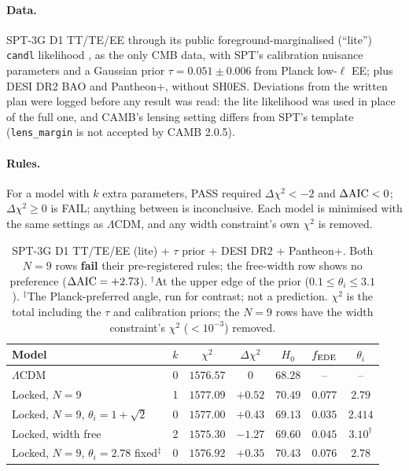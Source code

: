 \documentclass[11pt]{article}
\newcommand{\SPTfreeDchi}{\ensuremath{-1.27}}   %
\newcommand{\SPTfreeHz}{\ensuremath{69.60}}     %
\newcommand{\SPTfreeF}{\ensuremath{0.045}}      %
\newcommand{\SPTfreeVerdict}{no preference ($\Delta{\rm AIC}=+2.73$)}
\begin{document}
\paragraph{Data.} SPT-3G D1 TT/TE/EE \cite{camphuis2025} through its public foreground-marginalised
(``lite'') \texttt{candl} likelihood \cite{balkenhol2024}, as the only CMB data, with SPT's calibration
nuisance parameters and a Gaussian prior $\tau=0.051\pm0.006$ from Planck low-$\ell$ EE; plus DESI DR2
BAO and Pantheon+, without SH0ES. Deviations from the written plan were logged before any result was
read: the lite likelihood was used in place of the full one, and CAMB's lensing setting differs from
SPT's template (\texttt{lens\_margin} is not accepted by CAMB 2.0.5).

\paragraph{Rules.} For a model with $k$ extra parameters, PASS required $\Delta\chi^2<-2$ and
$\Delta{\rm AIC}<0$; $\Delta\chi^2\ge0$ is FAIL; anything between is inconclusive. Each model is
minimised with the same settings as $\Lambda$CDM, and any width constraint's own $\chi^2$ is removed.

\begin{table}[h]
\centering
\small
\begin{tabular}{lcccccc}
\toprule
Model & $k$ & $\chi^2$ & $\Delta\chi^2$ & $H_0$ & $f_{\rm EDE}$ & $\theta_i$\\
\midrule
$\Lambda$CDM & 0 & $1576.57$ & $0$ & $68.28$ & -- & --\\
Locked, $N=9$ & 1 & $1577.09$ & $+0.52$ & $70.49$ & $0.077$ & $2.79$\\
Locked, $N=9$, $\theta_i=1+\sqrt2$ & 0 & $1577.00$ & $+0.43$ & $69.13$ & $0.035$ & $2.414$\\
Locked, width free & 2 & $1575.30$ & \SPTfreeDchi & \SPTfreeHz & \SPTfreeF & $3.10^\dagger$\\
Locked, $N=9$, $\theta_i=2.78$ fixed$^\ddagger$ & 0 & $1576.92$ & $+0.35$ & $70.43$ & $0.076$ & $2.78$\\
\bottomrule
\end{tabular}
\caption{SPT-3G D1 TT/TE/EE (lite) + $\tau$ prior + DESI DR2 + Pantheon+. Both $N=9$ rows
\textbf{fail} their pre-registered rules; the free-width row shows \SPTfreeVerdict.
$^\dagger$At the upper edge of the prior ($0.1\le\theta_i\le3.1$). $^\ddagger$The Planck-preferred angle, run for
contrast; not a prediction. $\chi^2$ is the total
including the $\tau$ and calibration priors; the $N=9$ rows have the width constraint's $\chi^2$
($<10^{-3}$) removed.}
\label{tab:spt}
\end{table}
\end{document}
